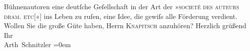 \begin{ledgroupsized}[t]{13cm}
                    Bühnenautoren eine deutſche  Geſellschaft
                    in der Art der »\textsc{societé des
                        auteurs dram. etc}{[}«{]} ins Leben zu rufen, eine {\pb}Idee, die gewiſs alle Förderung verdient.\pend
           \pstart
           Wollen Sie die große Güte haben, Herrn \textsc{Knapitsch} anzuhören?\pend
           \pstart
           Herzlich grüßend{\\[\baselineskip]}Ihr{\\[\baselineskip]}\spacefill\mbox{Arth Schnitzler}\pend
           \leftskip=0em{}
         
         \endnumbering{}\end{ledgroupsized}  \newcommand{\dateiname}{L01573}\newcommand{\titel}{Arthur Schnitzler an Gerhart Hauptmann, [17. 1. 1906]}\newcommand{\editorInnen}{ Martin Anton Müller und Gerd-Hermann Susen}
      